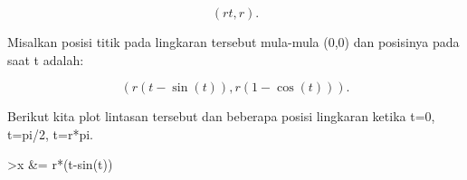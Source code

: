 \documentclass[a4paper,10pt]{article}
\begin{document}
\begin{eulernotebook}
\begin{eulercomment}
\end{eulercomment}
\begin{eulerformula}
\[
(rt,r).
\]
\end{eulerformula}
\begin{eulercomment}
Misalkan posisi titik pada lingkaran tersebut mula-mula (0,0) dan posisinya pada saat t adalah:

\end{eulercomment}
\begin{eulerformula}
\[
(r(t-\sin(t)),r(1-\cos(t))).
\]
\end{eulerformula}
\begin{eulercomment}
Berikut kita plot lintasan tersebut dan beberapa posisi lingkaran ketika t=0, t=pi/2, t=r*pi.
\end{eulercomment}
\begin{eulerprompt}
>x &= r*(t-sin(t))
\end{eulerprompt}
\begin{euleroutput}
  

\end{euleroutput}
\end{eulernotebook}
\end{document}
